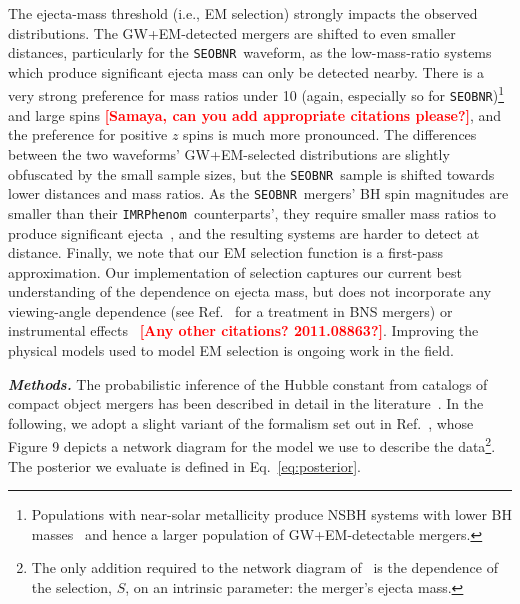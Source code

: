 \documentclass[%
 reprint,
 superscriptaddress,
 nofootinbib,
 amsmath,amssymb,
 aps,
]{revtex4-2}
\newcommand{\seobnr}{\texttt{SEOBNR}}
\newcommand{\imrp}{\texttt{IMRPhenom}}
\newcommand{\smf}[1]{\textcolor{red}{\bf [#1]}}
\begin{document}
The ejecta-mass threshold (i.e., EM selection) strongly impacts the observed distributions. The GW+EM-detected mergers are shifted to even smaller distances, particularly for the \seobnr\ waveform, as the low-mass-ratio systems which produce significant ejecta mass can only be detected nearby. There is a very strong preference for mass ratios under 10 (again, especially so for \seobnr)\footnote{Populations with near-solar metallicity produce NSBH systems with lower BH masses~\cite{Kruckow_etal:2018} and hence a larger population of GW+EM-detectable mergers.} and large spins \smf{Samaya, can you add appropriate citations please?}, and the preference for positive $z$ spins is much more pronounced. The differences between the two waveforms' GW+EM-selected distributions are slightly obfuscated by the small sample sizes, but the \seobnr\ sample is shifted towards lower distances and mass ratios. As the \seobnr\ mergers' BH spin magnitudes are smaller than their \imrp\ counterparts', they require smaller mass ratios to produce significant ejecta~\cite{Foucart_etal:2018}, and the resulting systems are harder to detect at distance. Finally, we note that our EM selection function is a first-pass approximation. Our implementation of selection captures our current best understanding of the dependence on ejecta mass, but does not incorporate any viewing-angle dependence (see Ref.~\cite{Chen:2020} for a treatment in BNS mergers) or instrumental effects~\cite{Setzer_etal:2019} \smf{Any other citations? 2011.08863?}. Improving the physical models used to model EM selection is ongoing work in the field.


\textbf{\emph{Methods.}} The probabilistic inference of the Hubble constant from catalogs of compact object mergers has been described in detail in the literature~\cite{Schutz:1986,Dalal:2006,Nissanke_etal:2010,Taylor_etal:2012,Nissanke_etal:2013,Abbott_etal:2017a,Chen_etal:2018,Fishbach_etal:2018,Feeney_etal:2018,Mandel_etal:2018,Gray_etal:2019,Mortlock_etal:2019,Vitale_etal:2020}. In the following, we adopt a slight variant of the formalism set out in Ref.~\cite{Mortlock_etal:2019}, whose Figure 9 depicts a network diagram for the model we use to describe the data\footnote{The only addition required to the network diagram of~\cite{Mortlock_etal:2019} is the dependence of the selection, $S$, on an intrinsic parameter: the merger's ejecta mass.}. The posterior we evaluate is defined in Eq.~\ref{eq:posterior}.
\end{document}
